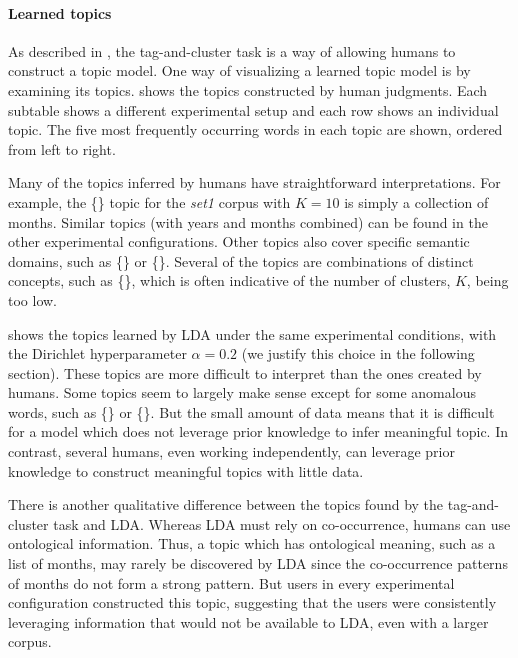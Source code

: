 \paragraph{Learned topics} As described in , the tag-and-cluster
task is a way of allowing humans to construct a topic model.  One way
of visualizing a learned topic model is by examining its topics.
 shows the topics constructed by human
judgments.  Each subtable shows a different experimental setup and
each row shows an individual topic.  The five most frequently
occurring words in each topic are shown, ordered from left to right.

Many of the topics inferred by humans have straightforward
interpretations.  For example, the \{\} topic for the \emph{set1} corpus with
$K=10$ is simply a collection of months.  Similar topics (with years
and months combined) can be found in the other experimental
configurations.  Other topics also cover specific semantic domains,
such as \{\} or \{\}.
Several of the topics are combinations of distinct concepts, such as
\{\}, which is often
indicative of the number of clusters, $K$, being too low.

 shows the topics learned by LDA under
the same experimental conditions, with the Dirichlet hyperparameter
$\alpha = 0.2$ (we justify this choice in the following section).
These topics are more difficult to interpret than the ones created by
humans.  Some topics seem to largely make sense except for some
anomalous words, such as \{\} or \{\}.  But the small amount of data means that it is difficult
for a model which does not leverage prior knowledge to infer
meaningful topic.  In contrast, several humans, even working
independently, can leverage prior knowledge to construct meaningful
topics with little data.

There is another qualitative difference between the topics found by
the tag-and-cluster task and LDA.  Whereas LDA must rely on
co-occurrence, humans can use ontological information.  Thus, a topic
which has ontological meaning, such as a list of months, may rarely be
discovered by LDA since the co-occurrence patterns of months do not
form a strong pattern.  But users in every experimental configuration
constructed this topic, suggesting that the users were consistently
leveraging information that would not be available to LDA, even with a
larger corpus.

